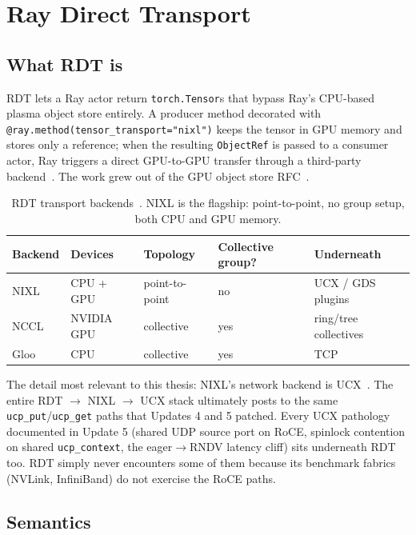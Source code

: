 \documentclass[11pt,letterpaper]{article}
\begin{document}
\section{Ray Direct Transport}

\subsection{What RDT is}

RDT lets a Ray actor return \texttt{torch.Tensor}s that bypass Ray's CPU-based plasma object store entirely. A producer method decorated with \texttt{@ray.method(tensor\_transport="nixl")} keeps the tensor in GPU memory and stores only a reference; when the resulting \texttt{ObjectRef} is passed to a consumer actor, Ray triggers a direct GPU-to-GPU transfer through a third-party backend~\cite{ray_rdt_docs}. The work grew out of the GPU object store RFC~\cite{ray_gpu_rfc}.

\begin{table}[ht]
\centering\small
\begin{tabular}{lllll}
\toprule
\textbf{Backend} & \textbf{Devices} & \textbf{Topology} & \textbf{Collective group?} & \textbf{Underneath} \\
\midrule
NIXL & CPU + GPU & point-to-point & no & UCX / GDS plugins \\
NCCL & NVIDIA GPU & collective & yes & ring/tree collectives \\
Gloo & CPU & collective & yes & TCP \\
\bottomrule
\end{tabular}
\caption{RDT transport backends~\cite{ray_rdt_docs}. NIXL is the flagship: point-to-point, no group setup, both CPU and GPU memory.}
\label{tab:rdt_backends}
\end{table}

The detail most relevant to this thesis: NIXL's network backend is UCX~\cite{nixl_docs}. The entire RDT $\to$ NIXL $\to$ UCX stack ultimately posts to the same \texttt{ucp\_put}/\texttt{ucp\_get} paths that Updates 4 and 5 patched. Every UCX pathology documented in Update 5 (shared UDP source port on RoCE, spinlock contention on shared \texttt{ucp\_context}, the eager$\to$RNDV latency cliff) sits underneath RDT too. RDT simply never encounters some of them because its benchmark fabrics (NVLink, InfiniBand) do not exercise the RoCE paths.

\subsection{Semantics}
\end{document}
